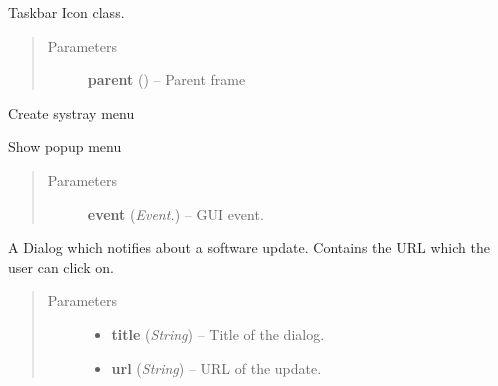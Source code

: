 \documentclass[letterpaper,10pt,english]{sphinxmanual}
\begin{document}

\begin{fulllineitems}
\label{api:wos.SysTray}
Taskbar Icon class.
\begin{quote}\begin{description}
\item[{Parameters}] \leavevmode
\textbf{parent} () -- Parent frame

\end{description}\end{quote}

\begin{fulllineitems}
\label{api:wos.SysTray.CreateMenu}
Create systray menu

\end{fulllineitems}


\begin{fulllineitems}
\label{api:wos.SysTray.ShowMenu}
Show popup menu
\begin{quote}\begin{description}
\item[{Parameters}] \leavevmode
\textbf{event} (\emph{Event.}) -- GUI event.

\end{description}\end{quote}

\end{fulllineitems}


\end{fulllineitems}


\begin{fulllineitems}
\label{api:wos.UpdateDialog}
A Dialog which notifies about a software update.
Contains the URL which the user can click on.
\begin{quote}\begin{description}
\item[{Parameters}] \leavevmode\begin{itemize}
\item {} 
\textbf{title} (\emph{String}) -- Title of the dialog.

\item {} 
\textbf{url} (\emph{String}) -- URL of the update.

\end{itemize}

\end{description}\end{quote}

\end{fulllineitems}
\end{document}
